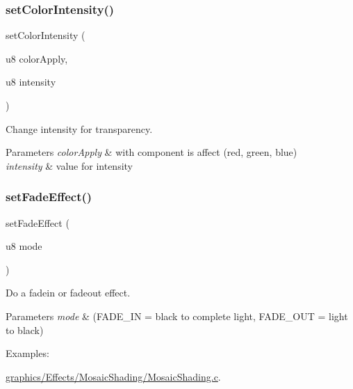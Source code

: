 \subsubsection{\texorpdfstring{set\+Color\+Intensity()}{setColorIntensity()}}
{\footnotesize\ttfamily set\+Color\+Intensity (\begin{DoxyParamCaption}\item[{u8}]{color\+Apply,  }\item[{u8}]{intensity }\end{DoxyParamCaption})}



Change intensity for transparency. 


\begin{DoxyParams}{Parameters}
{\em color\+Apply} & with component is affect (red, green, blue) \\
\hline
{\em intensity} & value for intensity \\
\hline
\end{DoxyParams}
\mbox{\label{a00416_ac34bd13a8556c8ac8e1eeeded15f7632}} 
\subsubsection{\texorpdfstring{set\+Fade\+Effect()}{setFadeEffect()}}
{\footnotesize\ttfamily set\+Fade\+Effect (\begin{DoxyParamCaption}\item[{u8}]{mode }\end{DoxyParamCaption})}



Do a fadein or fadeout effect. 


\begin{DoxyParams}{Parameters}
{\em mode} & (F\+A\+D\+E\+\_\+\+IN = black to complete light, F\+A\+D\+E\+\_\+\+O\+UT = light to black) \\
\hline
\end{DoxyParams}
\begin{Desc}
\item[Examples\+: ]\par
\hyperlink{a00469}{graphics/\+Effects/\+Mosaic\+Shading/\+Mosaic\+Shading.\+c}.\end{Desc}
\mbox{\label{a00416_afd9e46ae627d055dd8c98a4b0ebb73b1}} 
